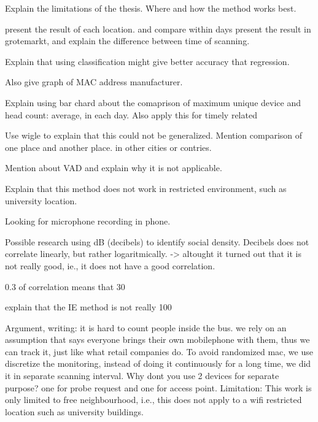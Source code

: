 Explain the limitations of the thesis. Where and how the method works best.

present the result of each location. and compare within days
present the result in grotemarkt, and explain the difference between time of scanning.

Explain that using classification might give better accuracy that regression.

Also give graph of MAC address manufacturer.

Explain using bar chard about the comaprison of maximum unique device and head count: average, in each day. Also apply this for timely related 

Use wigle to explain that this could not be generalized. Mention comparison of one place and another place. in other cities or contries.

Mention about VAD and explain why it is not applicable.

Explain that this method does not work in restricted environment, such as university location.

Looking for microphone recording in phone.

Possible research using dB (decibels) to identify social density.
Decibels does not correlate linearly, but rather logaritmically. -> altought it turned out that it is not really good, ie., it does not have a good correlation.

0.3 of correlation means that 30%

explain that the IE method is not really 100%

Argument, writing:
it is hard to count people inside the bus.
we rely on an assumption that says everyone brings their own mobilephone with them, thus we can track it, just like what retail companies do.
To avoid randomized mac, we use discretize the monitoring, instead of doing it continuously for a long time, we did it in separate scanning interval.
Why dont you use 2 devices for separate purpose? one for probe request and one for access point.
Limitation: This work is only limited to free neighbourhood, i.e., this does not apply to a wifi restricted location such as university buildings.

